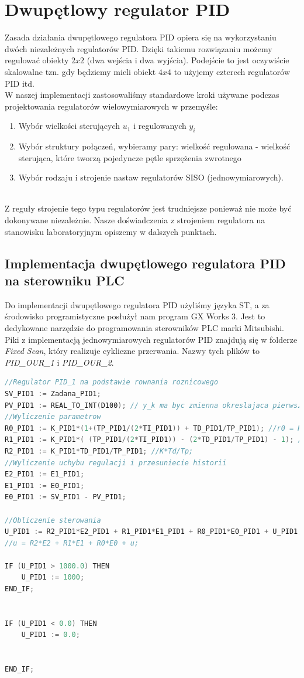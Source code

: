 \chapter{Dwupętlowy regulator PID}
\label{thermal_pid}
Zasada działania dwupętlowego regulatora PID opiera się na wykorzystaniu dwóch niezależnych regulatorów PID. Dzięki takiemu rozwiązaniu możemy regulować obiekty $2x2$ (dwa wejścia i dwa wyjścia). Podejście to jest oczywiście skalowalne tzn. gdy będziemy mieli obiekt $4x4$ to użyjemy czterech regulatorów PID itd. 
\\ \indent W naszej implementacji zastosowaliśmy standardowe kroki używane podczas projektowania regulatorów wielowymiarowych w przemyśle:
\begin{enumerate}
\item Wybór wielkości sterujących $u_{1}$ i regulowanych $y_{i}$
\item Wybór struktury połączeń, wybieramy pary: wielkość regulowana - wielkość sterująca, które tworzą pojedyncze pętle sprzężenia zwrotnego 
\item Wybór rodzaju i strojenie nastaw regulatorów SISO (jednowymiarowych). 
\end{enumerate}
~\\ Z reguły strojenie tego typu regulatorów jest trudniejsze ponieważ nie może być dokonywane niezależnie. Nasze doświadczenia z strojeniem regulatora na stanowisku laboratoryjnym opiszemy w dalszych punktach. 

\section{Implementacja dwupętlowego regulatora PID na sterowniku PLC}
\label{thermal_pid_impl}
Do implementacji dwupętlowego regulatora PID użyliśmy języka ST, a za środowisko programistyczne posłużył nam program GX Works 3. Jest to dedykowane narzędzie do programowania sterowników PLC marki Mitsubishi. Piki z implementacją jednowymiarowych regulatorów PID znajdują się w folderze \textit{Fixed Scan}, który realizuje cykliczne przerwania. Nazwy tych plików to \textit{PID\_OUR\_1} i \textit{PID\_OUR\_2}.
\begin{lstlisting}[caption={Kod pierwszego jednowymiarowego regulatora PID}, language=C]
//Regulator PID_1 na podstawie rownania roznicowego
SV_PID1 := Zadana_PID1;
PV_PID1 := REAL_TO_INT(D100); // y_k ma byc zmienna okreslajaca pierwsze wyjscie z obiektu
//Wyliczenie parametrow
R0_PID1 := K_PID1*(1+(TP_PID1/(2*TI_PID1)) + TD_PID1/TP_PID1); //r0 = K*( 1+(Tp/(2*Ti))+Td/Tp );
R1_PID1 := K_PID1*( (TP_PID1/(2*TI_PID1)) - (2*TD_PID1/TP_PID1) - 1); //r1 = K*( (Tp/(2*Ti))-(2*Td/Tp)-1 );
R2_PID1 := K_PID1*TD_PID1/TP_PID1; //K*Td/Tp;
//Wyliczenie uchybu regulacji i przesuniecie historii
E2_PID1 := E1_PID1;
E1_PID1 := E0_PID1;
E0_PID1 := SV_PID1 - PV_PID1;

//Obliczenie sterowania
U_PID1 := R2_PID1*E2_PID1 + R1_PID1*E1_PID1 + R0_PID1*E0_PID1 + U_PID1;
//u = R2*E2 + R1*E1 + R0*E0 + u;

IF (U_PID1 > 1000.0) THEN
	U_PID1 := 1000;
END_IF;	
	
	
IF (U_PID1 < 0.0) THEN
	U_PID1 := 0.0;
	
	
END_IF;
\end{lstlisting}

